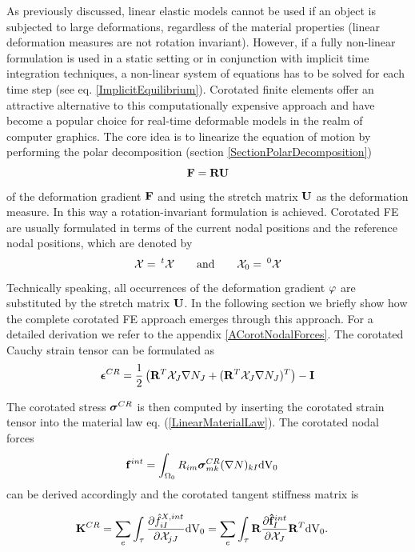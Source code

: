 As previously discussed, linear elastic models cannot be used if an object is subjected to large deformations, regardless of the material properties (linear deformation measures are not rotation invariant). However, if a fully non-linear formulation is used in a static setting or in conjunction with implicit time integration techniques, a non-linear system of equations has to be solved for each time step (see eq. \ref{ImplicitEquilibrium}). Corotated finite elements offer an attractive alternative to this computationally expensive approach and have become a popular choice for real-time deformable models in the realm of computer graphics. The core idea is to linearize the equation of motion by performing the polar decomposition (section \ref{SectionPolarDecomposition}) 
\begin{equation}
\mathbf {F } = \mathbf{R} \mathbf{U}
\end{equation}
of the deformation gradient $\mathbf {F }$ and using the stretch matrix $\mathbf{U}$ as the deformation measure. In this way a rotation-invariant formulation is achieved. Corotated FE are usually formulated in terms of the current nodal positions and the reference nodal positions, which are denoted by
\begin{equation}
\mcx = \mth \mcx \qquad \textnormal{and} \qquad \mcx_0 = \mthZero \mcx
\end{equation}
Technically speaking, all occurrences of the deformation gradient $\varphi$ are substituted by the stretch matrix $\mathbf{U}$. In the following section we briefly show how the complete corotated FE approach emerges through this approach. For a detailed derivation we refer to the appendix \ref{ACorotNodalForces}. The corotated Cauchy strain tensor can be formulated as
\begin{equation}
\boldsymbol{\epsilon} ^{CR}  = \frac{1}{2} \left( \mathbf{R}^T \mathcal{X} _J \nabla N_J  +  (\mathbf{R}^T \mathcal{X} _J \nabla N_J )^T \right) -  \mathbf {I }
\end{equation}

The corotated stress $\boldsymbol{\sigma}^{CR}$ is then computed by inserting the corotated strain tensor into the material law eq. (\ref{LinearMaterialLaw}). The corotated nodal forces
\begin{alignat}{1}
\mathbf f ^{int} &=   \int _{\Omega _0}  R_{im} \boldsymbol{\sigma}^{CR}_{mk}  (\nabla N)_{kI}  \textnormal{dV}_0
\label{CoRotNodalForces}
\end{alignat}
can be derived accordingly and the corotated tangent stiffness matrix is

\begin{alignat}{1}
\mathbf K ^{CR} &=  \sum_{e} \int _{\tau}  \frac{\partial \hat{f} ^{X,int}_{iI} }{\partial \mathcal{X}  _{jJ}}  \textnormal{dV}_0 = \sum_{e} \int _{\tau}   \mathbf{R}  \frac{\partial \mathbf {\hat{f}} ^{int}_I }{\partial \mathcal{X}  _{J}}   \mathbf{R}^T  \textnormal{dV}_0 .
\label{CoRotStiffnessMatrix}
\end{alignat}

